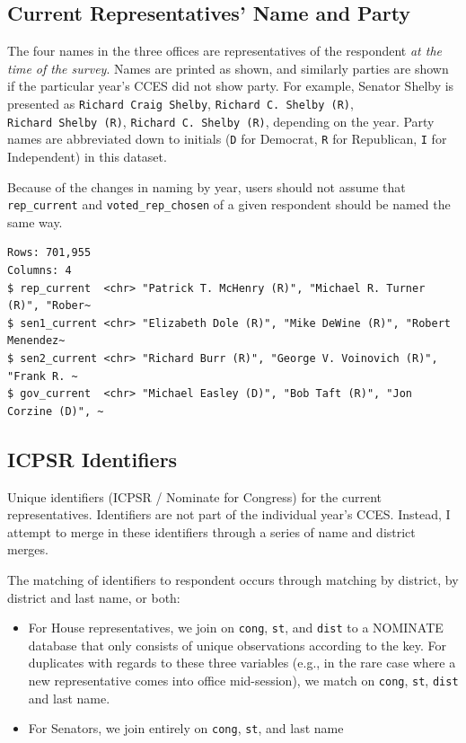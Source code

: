\documentclass[10pt,article,oneside]{memoir}
\begin{document}
\subsection{Current Representatives' Name and
Party}\label{current-representatives-name-and-party}

The four names in the three offices are representatives of the
respondent \emph{at the time of the survey}. Names are printed as shown,
and similarly parties are shown if the particular year's CCES did not
show party. For example, Senator Shelby is presented as
\texttt{Richard\ Craig\ Shelby}, \texttt{Richard\ C.\ Shelby\ (R)},
\texttt{Richard\ Shelby\ (R)}, \texttt{Richard\ C.\ Shelby\ (R)},
depending on the year. Party names are abbreviated down to initials
(\texttt{D} for Democrat, \texttt{R} for Republican, \texttt{I} for
Independent) in this dataset.

Because of the changes in naming by year, users should not assume that
\texttt{rep\_current} and \texttt{voted\_rep\_chosen} of a given
respondent should be named the same way.

\begin{verbatim}
Rows: 701,955
Columns: 4
$ rep_current  <chr> "Patrick T. McHenry (R)", "Michael R. Turner (R)", "Rober~
$ sen1_current <chr> "Elizabeth Dole (R)", "Mike DeWine (R)", "Robert Menendez~
$ sen2_current <chr> "Richard Burr (R)", "George V. Voinovich (R)", "Frank R. ~
$ gov_current  <chr> "Michael Easley (D)", "Bob Taft (R)", "Jon Corzine (D)", ~
\end{verbatim}

\subsection{ICPSR Identifiers}\label{icpsr-identifiers}

Unique identifiers (ICPSR / Nominate for Congress) for the current
representatives. Identifiers are not part of the individual year's CCES.
Instead, I attempt to merge in these identifiers through a series of
name and district merges.

The matching of identifiers to respondent occurs through matching by
district, by district and last name, or both:

\begin{itemize}
\tightlist
\item
  For House representatives, we join on \texttt{cong}, \texttt{st}, and
  \texttt{dist} to a NOMINATE database that only consists of unique
  observations according to the key. For duplicates with regards to
  these three variables (e.g., in the rare case where a new
  representative comes into office mid-session), we match on
  \texttt{cong}, \texttt{st}, \texttt{dist} and last name.
\item
  For Senators, we join entirely on \texttt{cong}, \texttt{st}, and last
  name
\end{itemize}
\end{document}
